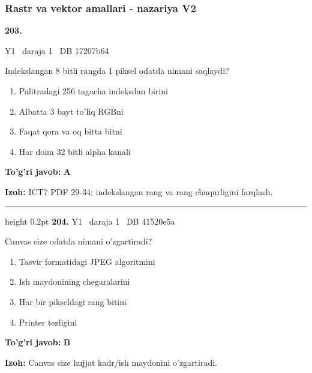 \documentclass[10pt,a4paper,oneside]{article}
\begin{document}
\subsubsection{Rastr va vektor amallari - nazariya V2}
\hypertarget{q203}{\textbf{\color{ink}203.}}  {\color{muted}\scriptsize Y1 \textbullet\ daraja 1 \textbullet\ DB 17207b64}
\par
Indekslangan 8 bitli rangda 1 piksel odatda nimani saqlaydi?
\begin{enumerate}[label=\Alph*),leftmargin=9mm]
\item Palitradagi 256 tagacha indeksdan birini
\item Albatta 3 bayt to'liq RGBni
\item Faqat qora va oq bitta bitni
\item Har doim 32 bitli alpha kanali
\end{enumerate}
\begin{tcolorbox}[enhanced,breakable,colback=teal!4,colframe=teal!45!black,boxrule=0.45pt,arc=1.2mm,left=2.8mm,right=2.8mm,top=2mm,bottom=2mm,before skip=2mm,after skip=2mm]
\textbf{\color{teal}To'g'ri javob:} \textbf{A}
\par\smallskip
\textbf{Izoh:} ICT7 PDF 29-34: indekslangan rang va rang chuqurligini farqlash.
\end{tcolorbox}
\vspace{2mm}\hrule height 0.2pt \vspace{4mm}
\hypertarget{q204}{\textbf{\color{ink}204.}}  {\color{muted}\scriptsize Y1 \textbullet\ daraja 1 \textbullet\ DB 41520e5a}
\par
Canvas size odatda nimani o'zgartiradi?
\begin{enumerate}[label=\Alph*),leftmargin=9mm]
\item Tasvir formatidagi JPEG algoritmini
\item Ish maydonining chegaralarini
\item Har bir pikseldagi rang bitini
\item Printer tezligini
\end{enumerate}
\begin{tcolorbox}[enhanced,breakable,colback=teal!4,colframe=teal!45!black,boxrule=0.45pt,arc=1.2mm,left=2.8mm,right=2.8mm,top=2mm,bottom=2mm,before skip=2mm,after skip=2mm]
\textbf{\color{teal}To'g'ri javob:} \textbf{B}
\par\smallskip
\textbf{Izoh:} Canvas size hujjat kadr/ish maydonini o'zgartiradi.
\end{tcolorbox}
\end{document}

